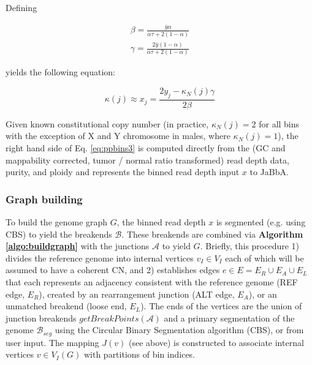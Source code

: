 \documentclass[phd,tocprelim]{cornell}
\begin{document}
Defining

\begin{equation} \label{eq:purityploidycorrection}
\begin{split}
    \beta = \frac{\bar{y}\alpha}{\alpha\tau+2(1-\alpha)} \\
    \gamma = \frac{2\bar{y}(1-\alpha)}{\alpha\tau+2(1-\alpha)}
\end{split}
\end{equation}

yields the following equation:

\begin{equation} \label{eq:ppbins3}
\kappa(j) \approx x_j = \frac{2y_j - \kappa_N(j)\gamma}{2\beta}
\end{equation}

Given known constitutional copy number (in practice, $\kappa_N(j) = 2$ for all bins with the exception of X and Y chromosome in males, where $\kappa_N(j) = 1$), the right hand side of Eq. \ref{eq:ppbins3} is computed directly from the (GC and mappability corrected, tumor / normal ratio transformed) read depth data, purity, and ploidy and represents the binned read depth input $x$ to JaBbA. 

\subsubsection*{Graph building}
To build the genome graph $G$, the binned read depth $x$ is segmented (e.g. using CBS) to yield the breakends $\mathcal{B}$.  These breakends are combined via \textbf{Algorithm \ref{algo:buildgraph}} with the junctions $\mathcal{A}$ to yield $G$.  Briefly, this procedure 1) divides the reference genome into internal vertices $v_I \in V_I$ each of which will be assumed to have a coherent CN, and 2) establishes edges $e \in E=E_{R} \cup E_{A} \cup E_{L}$ that each represents an adjacency consistent with the reference genome (REF edge, $E_R$), created by an rearrangement junction (ALT edge, $E_A$), or an unmatched breakend (loose end, $E_L$). The ends of the vertices are the union of junction breakends $getBreakPoints(\mathcal{A})$ and a primary segmentation of the genome $\mathcal{B}_{seg}$ using the Circular Binary Segmentation algorithm \cite{olshen2004} (CBS), or from user input.  The mapping $J(v)$ (see above) is constructed to associate internal vertices $v \in V_I(G)$ with partitions of bin indices. 
\end{document}
